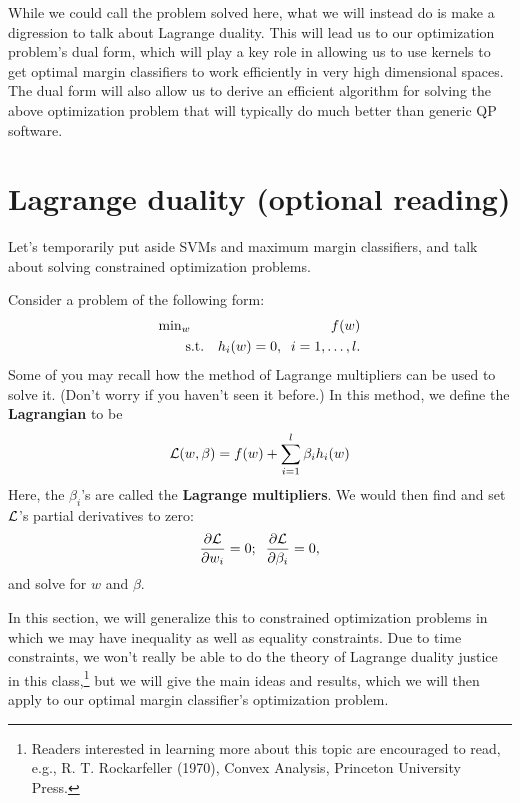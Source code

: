 \documentclass{article}
\begin{document}
While we could call the problem solved here, what we will instead do is make a
digression to talk about Lagrange duality.  This will lead us to our optimization problem's
dual form, which will play a key role in allowing us to use kernels to get optimal
margin classifiers to work efficiently in very high dimensional spaces.  The dual form
will also allow us to derive an efficient algorithm for solving the above optimization
problem that will typically do much better than generic QP software.


\section{Lagrange duality (optional reading)}

Let's temporarily put aside SVMs and maximum margin classifiers, and talk about solving
constrained optimization problems.

Consider a problem of the following form:
\begin{eqnarray*}
&\hbox{min}_w& f(w) \\
&\;\;\;\;\;\;\;\hbox{s.t.}& h_i(w) = 0, \;\; i=1, \ldots, l.
\end{eqnarray*}
Some of you may recall how the method of Lagrange multipliers can be used to solve it.
(Don't worry if you haven't seen it before.)  In this method, we define
the {\bf Lagrangian} to be
\[
{\cal L}(w,\beta) = f(w) + \sum_{i=1}^l \beta_i h_i(w)
\]
Here, the $\beta_i$'s are called the {\bf Lagrange multipliers}.  We would then find and
set ${\cal L}$'s partial derivatives to zero:
\[
\frac{\partial{\cal L}}{\partial w_i} = 0; \;\;
\frac{\partial{\cal L}}{\partial \beta_i} = 0,
\]
and solve for $w$ and $\beta$.

In this section, we will generalize this to constrained optimization problems in which we may
have inequality as well as equality constraints.  Due to time constraints, we won't really be
able to do the theory of Lagrange duality justice in this class,\footnote{Readers interested in learning more
about this topic are encouraged to read, e.g., R. T. Rockarfeller (1970), Convex Analysis,
Princeton University Press.} but we will give the main ideas and results, which we will then
apply to our optimal margin classifier's optimization problem.
\end{document}
